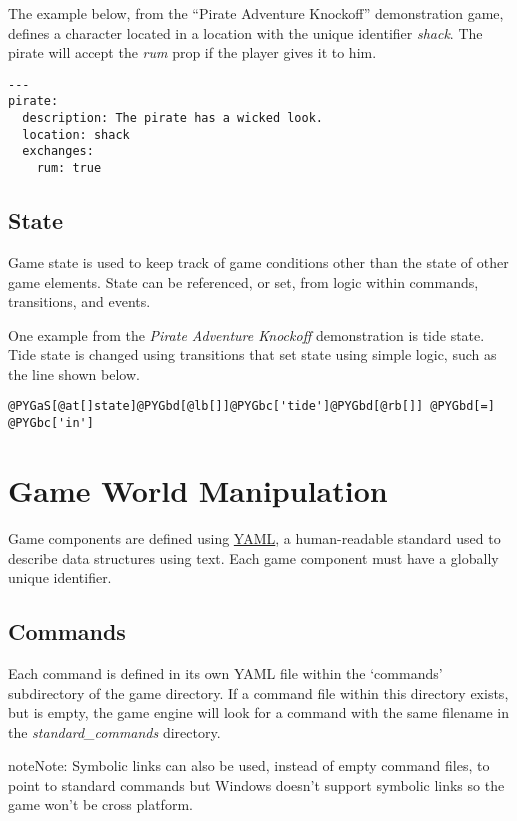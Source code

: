 \documentclass[letterpaper,10pt,english]{manual}
\begin{document}
The example below, from the ``Pirate Adventure Knockoff'' demonstration game, defines a character located in a location with the unique identifier \emph{shack}. The pirate will accept the \emph{rum} prop if the player gives it to him.

\begin{Verbatim}[commandchars=@\[\]]
--- 
pirate: 
  description: The pirate has a wicked look.
  location: shack
  exchanges:
    rum: true
\end{Verbatim}


\section{State}

Game state is used to keep track of game conditions other than the state of other game elements. State can be referenced, or set, from logic within commands, transitions, and events.

One example from the \emph{Pirate Adventure Knockoff} demonstration is tide state. Tide state is changed using transitions that set state using simple logic, such as the line shown below.

\begin{Verbatim}[commandchars=@\[\]]
@PYGaS[@at[]state]@PYGbd[@lb[]]@PYGbc['tide']@PYGbd[@rb[]] @PYGbd[=] @PYGbc['in']
\end{Verbatim}

\resetcurrentobjects
\hypertarget{--doc-manipulation}{}

\chapter{Game World Manipulation}

Game components are defined using \href{http://www.yaml.org/}{YAML}, a human-readable standard used to describe data structures using text. Each game component must have a globally unique identifier.


\section{Commands}

Each command is defined in its own YAML file within the `commands' subdirectory of the game directory. If a command file within this directory exists, but is empty, the game engine will look for a command with the same filename in the \emph{standard\_commands} directory.

\begin{notice}{note}{Note:}
Symbolic links can also be used, instead of empty command files, to point to standard commands but Windows doesn't support symbolic links so the game won't be cross platform.
\end{notice}
\end{document}
